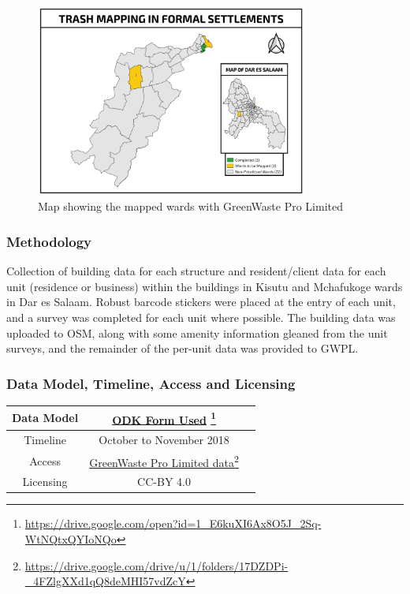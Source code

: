 \documentclass[a4paper,12pt,twoside]{article}
\begin{document}
\begin{figure}[h]
  \color{RHgreen}\caption{Map showing the mapped wards with GreenWaste Pro Limited}
  \centering
 \includegraphics[width=0.8\textwidth]{images/GWPL.png}
\end{figure}

\subsubsection{Methodology}

Collection of building data for each structure and resident/client data for each unit (residence or business) within the buildings in Kisutu and Mchafukoge wards in Dar es Salaam. Robust barcode stickers were placed at the entry of each unit, and a survey was completed for each unit where possible. The building data was uploaded to OSM, along with some amenity information gleaned from the unit surveys, and the remainder of the per-unit data was provided to GWPL.

\subsubsection{Data Model, Timeline, Access and Licensing}
\begin{center}
\begin{tabular}{|c|c|c|}  
 \hline
Data Model &
       \href{https://drive.google.com/open?id=1_E6kuXI6Ax8O5J_2Sq-WtNQtxQYIoNQo}{ODK Form Used} \footnote{\url{https://drive.google.com/open?id=1_E6kuXI6Ax8O5J_2Sq-WtNQtxQYIoNQo}} \\
 \hline
  Timeline  &  October to November 2018 \\
\hline  
 Access  & 
    \href{https://drive.google.com/drive/u/1/folders/17DZDPi-_4FZlgXXd1qQ8deMHI57vdZcY}{GreenWaste Pro Limited data}\footnote{\url{https://drive.google.com/drive/u/1/folders/17DZDPi-_4FZlgXXd1qQ8deMHI57vdZcY}} \\
   
\hline 
    Licensing & CC-BY 4.0 \\
\hline
\end{tabular}
\end{center}
\end{document}
